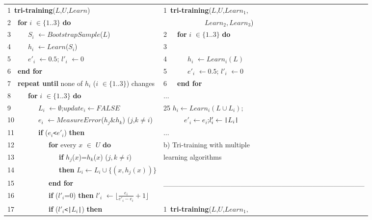 \documentclass[english]{jnlp_1.4}
\begin{document}
\begin{figure}[b]
\small
\centering
\begin{tabular}{|l|l|}
\hline
    1\  \textbf{tri-training}($L$,$U$,$Learn$)  & 1\ \textbf{tri-training}($L$,$U$,$Learn_{1}$, \\
    2\ \ \textbf{for} $i$ $\in \{1..3\}$ \textbf{do} &   \ \ \ \ \ \ \ \ \ \ \ \ $Learn_{2},Learn_{3}$)\\
    3\ \ \ \ \ $S_{i}$ $\leftarrow BootstrapSample$($L$) &  2\ \ \ \textbf{for} $i$ $\in \{1..3\}$ \textbf{do} \\
    4\ \ \ \ \ $h_{i}$ $\leftarrow Learn$($S_{i}$) &     3 \\
    5\ \ \ \ \ $e'_{i}$ $\leftarrow 0.5$; $l'_{i}$ $\leftarrow 0$ &    4\ \ \ \ \ \ $h_{i}$ $\leftarrow Learn_{i}(L)$ \\
    6\ \ \textbf{end for} &     5\ \ \ \ \ \ $e'_{i}$ $\leftarrow 0.5$; $l'_{i}$ $\leftarrow 0$ \\
    7\ \ \textbf{repeat until} none of $h_{i}$ ($i$ $\in \{1..3\}$) changes & 6\ \ \ \textbf{end for} \\
    8\ \ \ \ \ \textbf{for} $i$ $\in \{1..3\}$ \textbf{do} &  $\ldots$ \\
    9\ \ \ \ \ \ \ \ $L_{i}$ $\leftarrow \emptyset$;$update_{i} \leftarrow FALSE$  & 25 $h_{i}\leftarrow Learn_{i}(L\cup L_{i});$ \\
    10\ \ \ \ \ \ \ $e_{i}$ $\leftarrow MeasureError$($h_{j}$\&$h_{k}$) ($j$,$k$$\neq$$i$) & \ \ \ \ \ \ $e'_{i} \leftarrow e_{i}$;$l'_{i}\leftarrow \verb"|"L_{i}\verb"|"$ \\
    11\ \ \ \ \ \ \ \textbf{if} ($e_{i}$\verb"<"$e'_{i}$) \textbf{then} & $\ldots$ \\
    12\ \ \ \ \ \ \ \ \ \ \textbf{for} every $x$ $\in$ $U$ \textbf{do} & \textsf{b) Tri-training with multiple}  \\
    13\ \ \ \ \ \ \ \ \ \ \ \ \ \textbf{if} $h_{j}$($x$)=$h_{k}$($x$) ($j,k \neq i$) & \textsf{learning algorithms}    \\
    14\ \ \ \ \ \ \ \ \ \ \ \ \ \textbf{then} $L_{i}\leftarrow L_{i} \cup \{(x,h_{j}(x))\}$  & \  \\
    15\ \ \ \ \ \ \ \  \ \ \textbf{end for}  & \_\_\_\_\_\_\_\_\_\_\_\_\_\_\_\_\_\_\_\_\_\_\_\_\_\_\_\_\_\_\_\_\_\_\_\_\_\_\_ \\
    16\ \ \ \ \ \ \ \ \ \ \textbf{if} ($l'_{i}$=0) \textbf{then} $l'_{i}$ $\leftarrow \lfloor \frac{e_{i}}{e'_{i}-e_{i}}+1 \rfloor$  &   \\
    17\ \ \ \ \ \ \ \ \ \ \textbf{if} ($l'_{i}$\verb"<|"$L_{i}$\verb"|") \textbf{then} & 1\ \textbf{tri-training}($L$,$U$,$Learn_{1},$ \\

\end{tabular}
\end{figure}
\end{document}
